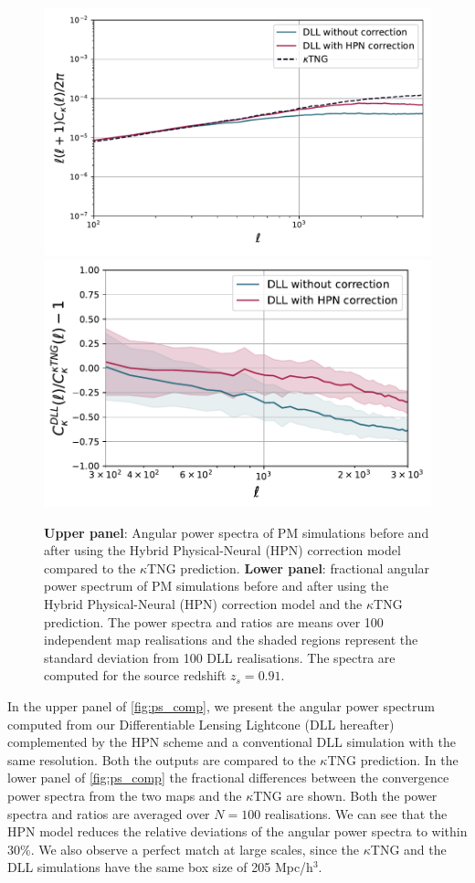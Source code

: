 \documentclass[twocolumn,twocolappendix]{aastex63}
\begin{document}
\begin{figure}
    \centering
    \includegraphics[width=0.95\columnwidth]{paper/figures/cls_DLL_vs_ktng_hpn.pdf}
        \includegraphics[width=\columnwidth]{paper/figures/res_cls_DLL_vs_ktng_hpn.pdf}
    \caption{
    \textbf{Upper panel}: Angular power spectra of PM simulations before and after using the Hybrid Physical-Neural (HPN) correction model compared to the $\kappa$TNG prediction. \textbf{Lower panel}: fractional angular power spectrum of PM simulations before and after using the Hybrid Physical-Neural (HPN) correction model and the $\kappa$TNG prediction. The power spectra and ratios are means over 100 independent map realisations and the shaded regions represent the standard deviation from 100 DLL realisations. The spectra are computed for the source redshift $z_s=0.91$. 
}
    \label{fig:ps_comp}
\end{figure}

In the upper panel of \autoref{fig:ps_comp}, we present the angular power spectrum computed from our Differentiable Lensing Lightcone (DLL hereafter) complemented by the HPN scheme and a conventional DLL simulation with the same resolution. Both the outputs are compared to the $\kappa$TNG prediction. In the lower panel  of \autoref{fig:ps_comp} the fractional differences between the convergence power spectra from the two maps and the $\kappa$TNG are shown.  Both the power spectra and ratios are averaged over $N = 100$ realisations. 
We can see that the HPN  model reduces the relative deviations of the angular power spectra to within 30\%. 
We also observe a perfect match at large scales, since the $\kappa$TNG and the DLL simulations have the same box size of 205 Mpc/h$^3$.
\end{document}
